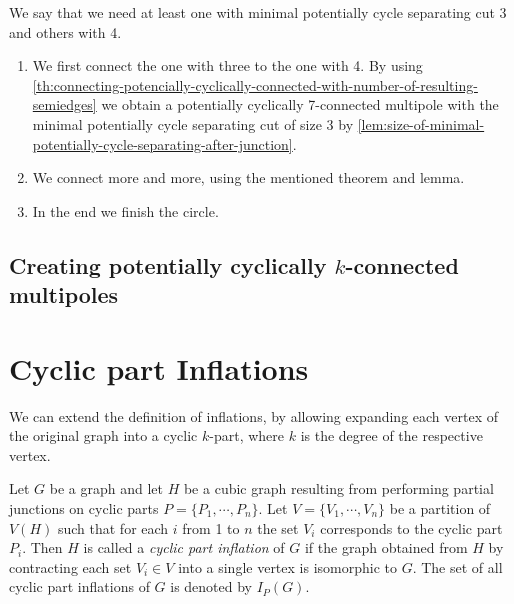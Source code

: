 \documentclass[12pt, twoside]{book}
\begin{document}
We say that we need at least one with minimal potentially cycle separating cut 3 and others with 4.

\begin{enumerate}
	\item We first connect the one with three to the one with 4. By using \cref{th:connecting-potencially-cyclically-connected-with-number-of-resulting-semiedges} we obtain a potentially cyclically 7-connected multipole with the minimal potentially cycle separating cut of size 3 by \cref{lem:size-of-minimal-potentially-cycle-separating-after-junction}.
	\item We connect more and more, using the mentioned theorem and lemma.
	\item In the end we finish the circle. 
\end{enumerate}

\section{Creating potentially cyclically $k$-connected multipoles}

\todo{}

\chapter{Cyclic part Inflations}

We can extend the definition of inflations, by allowing expanding each vertex of the original graph into a cyclic $k$-part, where $k$ is the degree of the respective vertex.


\begin{definition}
	\label{def:cyclic-part-inflation}
	Let $G$ be a graph and let $H$ be a cubic graph resulting from performing partial junctions on cyclic parts $P=\{P_1,\cdots,P_n\}$. Let $V=\{V_1,\cdots, V_n\}$ be a partition of $V(H)$ such that for each $i$ from 1 to $n$ the set $V_i$ corresponds to the cyclic part $P_i$. Then $H$ is called a \textit{cyclic part inflation} of $G$ if the graph obtained from $H$ by contracting each set $V_i\in V$ into a single vertex is isomorphic to $G$. The set of all cyclic part inflations of $G$ is denoted by $I_P(G)$.
\end{definition}
\end{document}
